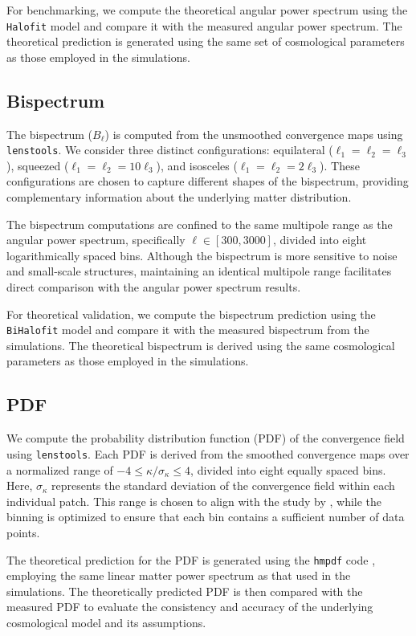 For benchmarking, we compute the theoretical angular power spectrum using the \texttt{Halofit} model \citep{2012ApJ...761..152T} and compare it with the measured angular power spectrum. The theoretical prediction is generated using the same set of cosmological parameters as those employed in the simulations.

\subsection{Bispectrum}
The bispectrum ($B_{\ell}$) is computed from the unsmoothed convergence maps using \texttt{lenstools}. We consider three distinct configurations: equilateral ($\ell_1 = \ell_2 = \ell_3$), squeezed ($\ell_1 = \ell_2 = 10\ell_3$), and isosceles ($\ell_1 = \ell_2 = 2\ell_3$). These configurations are chosen to capture different shapes of the bispectrum, providing complementary information about the underlying matter distribution.

The bispectrum computations are confined to the same multipole range as the angular power spectrum, specifically $\ell \in [300, 3000]$,  divided into eight logarithmically spaced bins. Although the bispectrum is more sensitive to noise and small-scale structures, maintaining an identical multipole range facilitates direct comparison with the angular power spectrum results.

For theoretical validation, we compute the bispectrum prediction using the \texttt{BiHalofit} model \citep{2020ApJ...895..113T} and compare it with the measured bispectrum from the simulations. The theoretical bispectrum is derived using the same cosmological parameters as those employed in the simulations.

\subsection{PDF}
We compute the probability distribution function (PDF) of the convergence field using \texttt{lenstools}. Each PDF is derived from the smoothed convergence maps over a normalized range of $-4 \leq \kappa/\sigma_{\kappa} \leq 4$, divided into eight equally spaced bins. Here, $\sigma_{\kappa}$ represents the standard deviation of the convergence field within each individual patch. This range is chosen to align with the study by \citet{2023arXiv230405928T}, while the binning is optimized to ensure that each bin contains a sufficient number of data points.

The theoretical prediction for the PDF is generated using the \texttt{hmpdf} code \citep{2020PhRvD.102l3545T}, employing the same linear matter power spectrum as that used in the simulations. The theoretically predicted PDF is then compared with the measured PDF to evaluate the consistency and accuracy of the underlying cosmological model and its assumptions.

